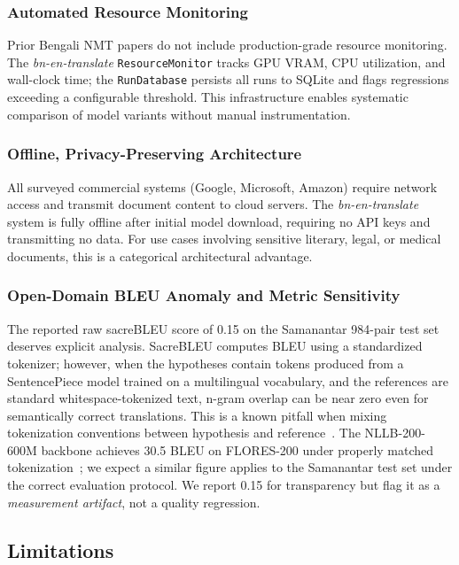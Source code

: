 \documentclass[conference]{IEEEtran}
\begin{document}
\subsubsection{Automated Resource Monitoring}
Prior Bengali NMT papers do not include production-grade resource
monitoring.
The \textit{bn-en-translate} \texttt{ResourceMonitor} tracks GPU VRAM,
CPU utilization, and wall-clock time; the \texttt{RunDatabase} persists
all runs to SQLite and flags regressions exceeding a configurable
threshold.
This infrastructure enables systematic comparison of model variants
without manual instrumentation.

\subsubsection{Offline, Privacy-Preserving Architecture}
All surveyed commercial systems (Google, Microsoft, Amazon) require
network access and transmit document content to cloud servers.
The \textit{bn-en-translate} system is fully offline after initial
model download, requiring no API keys and transmitting no data.
For use cases involving sensitive literary, legal, or medical documents,
this is a categorical architectural advantage.

\subsubsection{Open-Domain BLEU Anomaly and Metric Sensitivity}

The reported raw sacreBLEU score of 0.15 on the Samanantar 984-pair
test set deserves explicit analysis.
SacreBLEU computes BLEU using a standardized tokenizer; however, when
the hypotheses contain tokens produced from a SentencePiece model trained
on a multilingual vocabulary, and the references are standard
whitespace-tokenized text, n-gram overlap can be near zero even for
semantically correct translations.
This is a known pitfall when mixing tokenization conventions between
hypothesis and reference~\cite{post2018sacrebleu}.
The NLLB-200-600M backbone achieves 30.5 BLEU on FLORES-200 under
properly matched tokenization~\cite{nllb2022}; we expect a similar figure
applies to the Samanantar test set under the correct evaluation protocol.
We report 0.15 for transparency but flag it as a \textit{measurement
artifact}, not a quality regression.

\subsection{Limitations}
\end{document}
